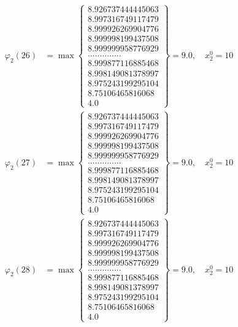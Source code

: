 \documentclass{article}
\begin{document}
\begin{align*}
  
  
  
\varphi_{2}(26) &= \max \left\{ \begin{array}{c}
8.926737444445063 \\
 8.997316749117479 \\
 8.999926269904776 \\
 8.999998199437508 \\
 8.999999958776929 \\
 .............. \\
 8.999877116885468 \\
 8.998149081378997 \\
 8.975243199295104 \\
 8.75106465816068 \\
 4.0
\end{array} \right\} = 9.0, \quad x_{2}^0 = 10\\
  
  
  
  
\varphi_{2}(27) &= \max \left\{ \begin{array}{c}
8.926737444445063 \\
 8.997316749117479 \\
 8.999926269904776 \\
 8.999998199437508 \\
 8.999999958776929 \\
 .............. \\
 8.999877116885468 \\
 8.998149081378997 \\
 8.975243199295104 \\
 8.75106465816068 \\
 4.0
\end{array} \right\} = 9.0, \quad x_{2}^0 = 10\\
  
  
  
  
\varphi_{2}(28) &= \max \left\{ \begin{array}{c}
8.926737444445063 \\
 8.997316749117479 \\
 8.999926269904776 \\
 8.999998199437508 \\
 8.999999958776929 \\
 .............. \\
 8.999877116885468 \\
 8.998149081378997 \\
 8.975243199295104 \\
 8.75106465816068 \\
 4.0
\end{array} \right\} = 9.0, \quad x_{2}^0 = 10\\
  

\end{align*}
\end{document}

